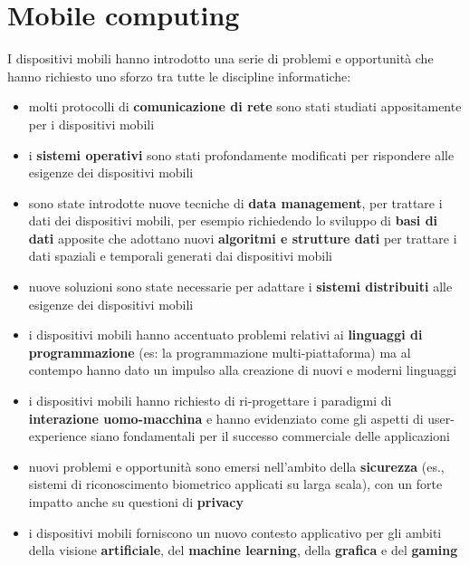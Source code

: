 \section{Mobile computing}
I dispositivi mobili hanno introdotto una serie di problemi e opportunità che hanno richiesto uno sforzo tra tutte le discipline informatiche:
\begin{itemize}
    \item molti protocolli di \textbf{comunicazione di rete} sono stati studiati appositamente per i dispositivi mobili
    \item i \textbf{sistemi operativi} sono stati profondamente modificati per rispondere alle esigenze dei dispositivi mobili
    \item sono state introdotte nuove tecniche di \textbf{data management}, per trattare i dati dei dispositivi mobili, per esempio richiedendo lo sviluppo di \textbf{basi di dati} apposite che adottano nuovi \textbf{algoritmi e strutture dati} per trattare i dati spaziali e temporali generati dai dispositivi mobili
    \item nuove soluzioni sono state necessarie per adattare i \textbf{sistemi distribuiti} alle esigenze dei dispositivi mobili
    \item i dispositivi mobili hanno accentuato problemi relativi ai \textbf{linguaggi di programmazione} (es: la programmazione multi-piattaforma) ma al contempo hanno dato un impulso alla creazione di nuovi e moderni linguaggi
    \item i dispositivi mobili hanno richiesto di ri-progettare i paradigmi di \textbf{interazione uomo-macchina} e hanno evidenziato come gli aspetti di user-experience siano fondamentali per il successo commerciale delle applicazioni
    \item nuovi problemi e opportunità sono emersi nell’ambito della \textbf{sicurezza} (es., sistemi di riconoscimento biometrico applicati su larga scala), con un forte impatto anche su questioni di \textbf{privacy}
    \item i dispositivi mobili forniscono un nuovo contesto applicativo per gli ambiti della visione \textbf{artificiale}, del \textbf{machine learning}, della \textbf{grafica} e del \textbf{gaming}
\end{itemize}

